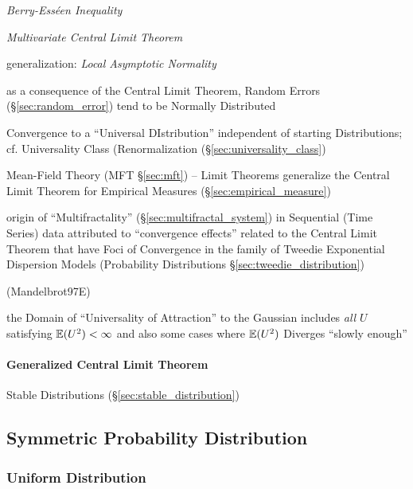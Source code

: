 \emph{Berry-Ess\'een Inequality}

\emph{Multivariate Central Limit Theorem}

generalization: \emph{Local Asymptotic Normality}

as a consequence of the Central Limit Theorem, Random Errors
(\S\ref{sec:random_error}) tend to be Normally Distributed

\fist Convergence to a ``Universal DIstribution'' independent of starting
Distributions; cf. Universality Class (Renormalization
(\S\ref{sec:universality_class})

\fist Mean-Field Theory (MFT \S\ref{sec:mft}) -- Limit Theorems generalize the
Central Limit Theorem for Empirical Measures (\S\ref{sec:empirical_measure})

\fist origin of ``Multifractality'' (\S\ref{sec:multifractal_system}) in
Sequential (Time Series) data attributed to ``convergence effects'' related to
the Central Limit Theorem that have Foci of Convergence in the family of Tweedie
Exponential Dispersion Models (Probability Distributions
\S\ref{sec:tweedie_distribution})

(Mandelbrot97E)

the Domain of ``Universality of Attraction'' to the Gaussian includes \emph{all}
$U$ satisfying $\mathbb{E}(U^2) < \infty$ and also some cases where $\mathbb{E}(U^2)$
Diverges ``slowly enough''



\paragraph{Generalized Central Limit Theorem}\label{sec:gclt}\hfill

Stable Distributions (\S\ref{sec:stable_distribution})



\subsection{Symmetric Probability Distribution}
\label{sec:symmetric_probability}

\subsubsection{Uniform Distribution}\label{sec:uniform_distribution}

